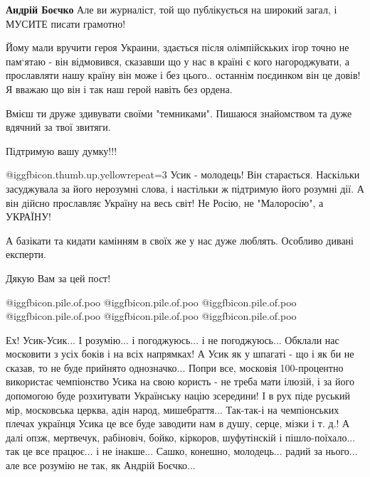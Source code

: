 \begin{itemize}
\begin{itemize}
\textbf{Андрій Боєчко} Але ви журналіст, той що публікується на широкий загал, і МУСИТЕ писати грамотно!
\end{itemize} %


Йому мали вручити героя Украини, здається після олімпійскьких ігор точно не
пам‘ятаю - він відмовився, сказавши що у нас в країні є кого нагороджувати, а
прославляти нашу країну він може і без цього.. останнім поєдинком він це довів!
Я вважаю що він і так наш герой навіть без ордена.

Вмієш ти друже здивувати своїми "темниками". Пишаюся знайомством та дуже вдячний за твої звитяги.

Підтримую вашу думку!!!


 @igg{fbicon.thumb.up.yellow}{repeat=3} Усик - молодець! Він старається. Наскільки засуджувала за його нерозумні
слова, і настільки ж підтримую його розумні дії. А він дійсно прославляє
Україну на весь світ! Не Росію, не "Малоросію", а УКРАЇНУ!

А базікати та кидати камінням в своїх же у нас дуже люблять. Особливо дивані
експерти.

Дякую Вам за цей пост!


\begin{itemize} %
 @igg{fbicon.pile.of.poo}   @igg{fbicon.pile.of.poo}   @igg{fbicon.pile.of.poo}   @igg{fbicon.pile.of.poo}   @igg{fbicon.pile.of.poo}   @igg{fbicon.pile.of.poo} 
\end{itemize} %


Ех! Усик-Усик... І розумію... і погоджуюсь... і не погоджуюсь... Обклали нас
московити з усіх боків і на всіх напрямках! А Усик як у шпагаті - що і як би не
сказав, то не буде прийнято однозначко... Попри все, московія 100-процентно
використає чемпіонство Усика на свою користь - не треба мати ілюзій, і за його
допомогою буде розхитувати Українську націю зсередини! І в рух піде руський
мір, московська церква, адін народ, мишебраття... Так-так-і на чемпіонських плечах
українця Усика це все буде заводити нам в душу, серце, мізки і т. д.! А далі
опзж, мертвечук, рабіновіч, бойко, кіркоров, шуфутінскій і пішло-поїхало... так це
все працює... і не інакше... Сашко, конешно, молодець... радий за нього... але все
розумію не так, як Андрій Боєчко...


\end{itemize}

